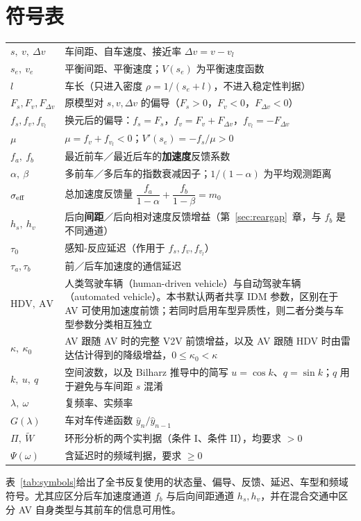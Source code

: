 \documentclass[11pt,a4paper,openany]{book}
\numberwithin{equation}{chapter}
\numberwithin{figure}{chapter}
\numberwithin{table}{chapter}
\newcommand{\dv}{\Delta v}
\newcommand{\tabletext}[2]{%
  \par\smallskip\noindent
  表~\ref{#1}给出了#2
  \par\smallskip
}
\begin{document}
\chapter*{符号表}

\begin{center}
\small
{}
\label{tab:symbols}
\begin{tabular}{p{2.4cm}p{11.4cm}}
\toprule
$s,\ v,\ \dv$ & 车间距、自车速度、接近率 $\dv=v-v_l$ \\
$s_e,\ v_e$ & 平衡间距、平衡速度；$V(s_e)$ 为平衡速度函数 \\
$l$ & 车长（只进入密度 $\rho=1/(s_e+l)$，不进入稳定性判据） \\
\midrule
$F_s,F_v,F_{\dv}$ & 原模型对 $s,v,\dv$ 的偏导（$F_s>0$，$F_v<0$，$F_{\dv}<0$） \\
$f_s,f_v,f_{v_l}$ & 换元后的偏导：$f_s=F_s$，$f_v=F_v+F_{\dv}$，$f_{v_l}=-F_{\dv}$ \\
$\mu$ & $\mu=f_v+f_{v_l}<0$；$V'(s_e)=-f_s/\mu>0$ \\
\midrule
$f_a,\ f_b$ & 最近前车／最近后车的\textbf{加速度}反馈系数 \\
$\alpha,\ \beta$ & 多前车／多后车的指数衰减因子；$1/(1-\alpha)$ 为平均观测距离 \\
$\sigma_{\rm eff}$ & 总加速度反馈量 $\dfrac{f_a}{1-\alpha}+\dfrac{f_b}{1-\beta}=m_0$ \\
$h_s,\ h_v$ & 后向\textbf{间距}／后向相对速度反馈增益（第~\ref{sec:reargap}~章，与 $f_b$ 是不同通道） \\
\midrule
$\tau_0$ & 感知-反应延迟（作用于 $f_s,f_v,f_{v_l}$） \\
$\tau_a,\tau_b$ & 前／后车加速度的通信延迟 \\
\midrule
$\mathrm{HDV},\ \mathrm{AV}$ & 人类驾驶车辆（human-driven vehicle）与自动驾驶车辆（automated vehicle）。本书默认两者共享 IDM 参数，区别在于 AV 可使用加速度前馈；若同时启用车型异质性，则二者分类与车型参数分类相互独立 \\
$\kappa,\ \kappa_0$ & AV 跟随 AV 时的完整 V2V 前馈增益，以及 AV 跟随 HDV 时由雷达估计得到的降级增益，$0\le\kappa_0<\kappa$ \\
\midrule
$k,\ u,\ q$ & 空间波数，以及 Bilharz 推导中的简写 $u=\cos k$、$q=\sin k$；$q$ 用于避免与车间距 $s$ 混淆 \\
$\lambda,\ \omega$ & 复频率、实频率 \\
$G(\lambda)$ & 车对车传递函数 $\hat y_n/\hat y_{n-1}$ \\
$\Pi,\ \widetilde W$ & 环形分析的两个实判据（条件 I、条件 II），均要求 $>0$ \\
$\Psi(\omega)$ & 含延迟时的频域判据，要求 $\ge0$ \\
\bottomrule
\end{tabular}
\end{center}
\tabletext{tab:symbols}{全书反复使用的状态量、偏导、反馈、延迟、车型和频域符号。尤其应区分后车加速度通道 $f_b$ 与后向间距通道 $h_s,h_v$，并在混合交通中区分 AV 自身类型与其前车的信息可用性。}
\end{document}
